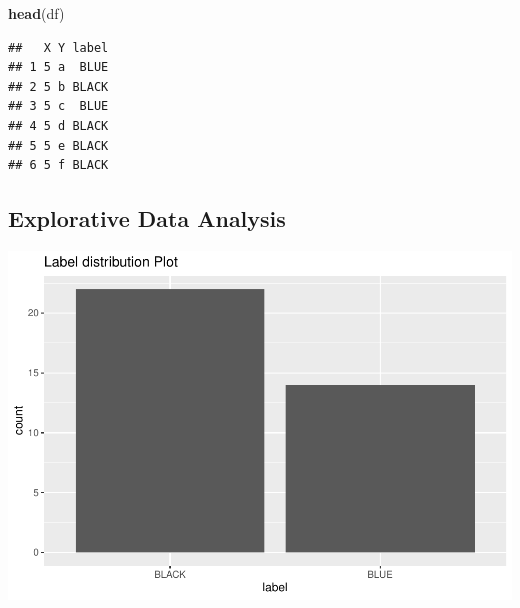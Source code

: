 \documentclass[
]{article}
\newenvironment{Shaded}{\begin{snugshade}}{\end{snugshade}}
\newcommand{\DataTypeTok}[1]{\textcolor[rgb]{0.13,0.29,0.53}{#1}}
\newcommand{\KeywordTok}[1]{\textcolor[rgb]{0.13,0.29,0.53}{\textbf{#1}}}
\newcommand{\NormalTok}[1]{#1}
\newcommand{\OperatorTok}[1]{\textcolor[rgb]{0.81,0.36,0.00}{\textbf{#1}}}
\newcommand{\StringTok}[1]{\textcolor[rgb]{0.31,0.60,0.02}{#1}}
\begin{document}
\begin{Shaded}
\begin{Highlighting}[]
\KeywordTok{head}\NormalTok{(df)}
\end{Highlighting}
\end{Shaded}

\begin{verbatim}
##   X Y label
## 1 5 a  BLUE
## 2 5 b BLACK
## 3 5 c  BLUE
## 4 5 d BLACK
## 5 5 e BLACK
## 6 5 f BLACK
\end{verbatim}

\hypertarget{explorative-data-analysis}{%
\subsection{Explorative Data Analysis}\label{explorative-data-analysis}}

\begin{Shaded}
\end{Shaded}

\includegraphics{622_HW1_files/figure-latex/unnamed-chunk-3-1.pdf}

\begin{Shaded}
\end{Shaded}
\end{document}
